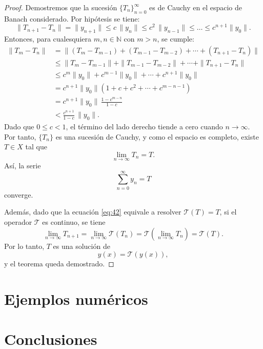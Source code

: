 \documentclass{GEM-JNL-FMP}
\theoremstyle{definition}
\numberwithin{equation}{section}
\begin{document}
\begin{proof}
Demostremos que la sucesión $\{T_n\}_{n=0}^{\infty}$ es de Cauchy en el espacio de Banach considerado.  
Por hipótesis se tiene:
\[
\|T_{n+1} - T_n\| = \|y_{n+1}\| \leq c\,\|y_n\| \leq c^2\,\|y_{n-1}\| \leq \dots \leq c^{n+1}\|y_0\|.
\]
Entonces, para cualesquiera $m,n \in \mathbb{N}$ con $m > n$, se cumple:
\[
\begin{aligned}
\|T_m - T_n\| 
&= \| (T_m - T_{m-1}) + (T_{m-1} - T_{m-2}) + \cdots + (T_{n+1} - T_n) \| \\[4pt]
&\le \|T_m - T_{m-1}\| + \|T_{m-1} - T_{m-2}\| + \cdots + \|T_{n+1} - T_n\| \\[4pt]
&\le c^{m}\|y_0\| + c^{m-1}\|y_0\| + \cdots + c^{n+1}\|y_0\| \\[4pt]
&= c^{n+1}\|y_0\| \left(1 + c + c^2 + \cdots + c^{m-n-1}\right) \\[4pt]
&= c^{n+1}\|y_0\|\,\frac{1 - c^{m-n}}{1-c} \\[4pt]
&< \frac{c^{n+1}}{1-c}\,\|y_0\|.
\end{aligned}
\]
Dado que $0 \le c < 1$, el término del lado derecho tiende a cero cuando $n \to \infty$.  
Por tanto, $\{T_n\}$ es una sucesión de Cauchy, y como el espacio es completo, existe $T \in X$ tal que
\[
\lim_{n\to\infty} T_n = T.
\]
Así, la serie
\[
\sum_{n=0}^{\infty} y_n = T
\]
converge.

Además, dado que la ecuación \eqref{eq:42} equivale a resolver $\mathcal{T}(T) = T$, si el operador $\mathcal{T}$ es continuo, se tiene
\[
\lim_{n\to\infty} T_{n+1} = \lim_{n\to\infty} \mathcal{T}(T_n) = \mathcal{T}\!\left( \lim_{n\to\infty} T_n \right) = \mathcal{T}(T).
\]
Por lo tanto, $T$ es una solución de
\[
y(x) = \mathcal{T}(y(x)),
\]
y el teorema queda demostrado.
\end{proof}

\section{Ejemplos numéricos}

\section{Conclusiones}





\end{document}
